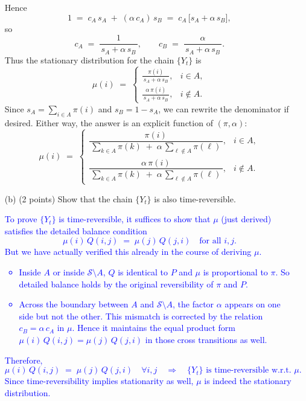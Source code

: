 \documentclass{article}
\begin{document}
\begin{itemize}
{Hence 
\[
  1 
  \;=\;
  c_A\,s_A \;+\; (\alpha\,c_A)\,s_B
  \;=\;
  c_A\,\bigl[s_A + \alpha\,s_B\bigr],
\]
so
\[
  c_A 
  \;=\;
  \frac{1}{\,s_A + \alpha\,s_B\,},
  \qquad
  c_B
  \;=\;
  \frac{\alpha}{\,s_A + \alpha\,s_B\,}.
\]
Thus the stationary distribution for the chain $\{Y_t\}$ is 
\[
  \mu(i) 
  \;=\;
  \begin{cases}
    \displaystyle 
    \frac{\pi(i)}{\,s_A + \alpha\,s_B\,}, 
    & i\in A,\\[7pt]
    \displaystyle
    \frac{\alpha\,\pi(i)}{\,s_A + \alpha\,s_B\,}, 
    & i\notin A.
  \end{cases}
\]
Since $s_A = \sum_{i\in A}\pi(i)$ and $s_B = 1-s_A$, we can rewrite the denominator if desired. 
Either way, the answer is an explicit function of $(\pi,\alpha)$:
\[
  \boxed{
  \mu(i) 
  \;=\;
  \begin{cases}
    \dfrac{\pi(i)}{\,\sum_{k\in A}\pi(k) \;+\; \alpha\,\sum_{\ell\notin A}\pi(\ell)\,}, & i \in A,\\[10pt]
    \dfrac{\alpha \,\pi(i)}{\,\sum_{k\in A}\pi(k) \;+\; \alpha\,\sum_{\ell\notin A}\pi(\ell)\,}, & i \notin A.
  \end{cases}
  }
\]}

    \item[(b)] (2 points) Show that the chain $\{Y_t\}$ is also time-reversible.

    \textcolor{blue}{To prove $\{Y_t\}$ is time-reversible, it suffices to show that $\mu$ (just derived) satisfies the detailed balance condition 
\[
  \mu(i)\,Q(i,j) \;=\; \mu(j)\,Q(j,i)
  \quad\text{for all } i,j.
\]
But we have actually verified this already in the course of deriving $\mu$. 
\begin{itemize}
\item 
Inside $A$ or inside $\mathcal{S}\setminus A$, $Q$ is identical to $P$ and $\mu$ is proportional to $\pi$. So detailed balance holds by the original reversibility of $\pi$ and $P$.
\item 
Across the boundary between $A$ and $\mathcal{S}\setminus A$, the factor $\alpha$ appears on one side but not the other. This mismatch is corrected by the relation $c_B=\alpha\,c_A$ in $\mu$. Hence it maintains the equal product form $\mu(i)\,Q(i,j)=\mu(j)\,Q(j,i)$ in those cross transitions as well.
\end{itemize}
Therefore,
\[
  \mu(i)\,Q(i,j) 
  \;=\;
  \mu(j)\,Q(j,i)
  \quad
  \forall i,j
  \quad\Longrightarrow\quad
  \text{$\{Y_t\}$ is time-reversible w.r.t.\ $\mu$.}
\]
Since time-reversibility implies stationarity as well, $\mu$ is indeed the stationary distribution.
}



\end{itemize}
\end{document}
